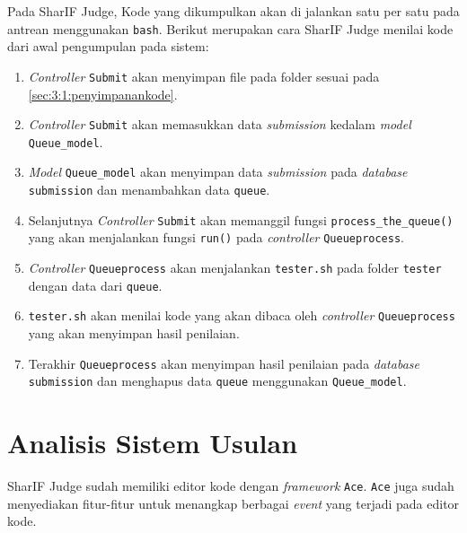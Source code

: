 Pada SharIF Judge, Kode yang dikumpulkan akan di jalankan satu per satu pada antrean menggunakan \verb|bash|. Berikut merupakan cara SharIF Judge menilai kode dari awal pengumpulan pada sistem:

\begin{enumerate}
      \item \textit{Controller} \verb|Submit| akan menyimpan file pada folder sesuai pada \ref{sec:3:1:penyimpanankode}.
      \item \textit{Controller} \verb|Submit| akan memasukkan data \textit{submission} kedalam \textit{model} \verb|Queue_model|.
      \item \textit{Model} \verb|Queue_model| akan menyimpan data \textit{submission} pada \textit{database} \verb|submission| dan menambahkan data \verb|queue|.
      \item Selanjutnya \textit{Controller} \verb|Submit| akan memanggil fungsi \verb|process_the_queue()| yang akan menjalankan fungsi \verb|run()| pada \textit{controller} \verb|Queueprocess|.
      \item \textit{Controller} \verb|Queueprocess| akan menjalankan \verb|tester.sh| pada folder \verb|tester| dengan data dari \verb|queue|.
      \item \verb|tester.sh| akan menilai kode yang akan dibaca oleh \textit{controller} \verb|Queueprocess| yang akan menyimpan hasil penilaian.
      \item Terakhir \verb|Queueprocess| akan menyimpan hasil penilaian pada \textit{database} \verb|submission| dan menghapus data \verb|queue| menggunakan \verb|Queue_model|.
\end{enumerate}


\section{Analisis Sistem Usulan}
\label{sec:3:sistemusulan}

SharIF Judge sudah memiliki editor kode dengan \textit{framework} \verb|Ace|. \verb|Ace| juga sudah menyediakan fitur-fitur untuk menangkap berbagai \textit{event} yang terjadi pada editor kode.


